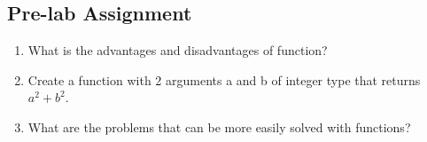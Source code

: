 \subsection{Pre-lab Assignment}
\begin{enumerate}
    \item What is the advantages and disadvantages of function?
    \item Create a function with 2 arguments a and b of integer type that returns $a^2 + b^2$.
    \item What are the problems that can be more easily solved with functions?
\end{enumerate}


